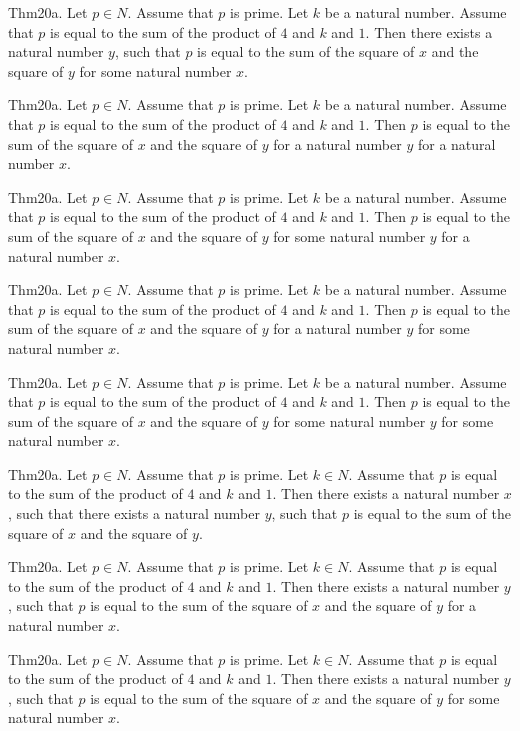 \documentclass{article}
\begin{document}
Thm20a. Let $p \in N$. Assume that $p$ is prime. Let $k$ be a natural number. Assume that $p$ is equal to the sum of the product of $4$ and $k$ and $1$. Then there exists a natural number $y$, such that $p$ is equal to the sum of the square of $x$ and the square of $y$ for some natural number $x$.

Thm20a. Let $p \in N$. Assume that $p$ is prime. Let $k$ be a natural number. Assume that $p$ is equal to the sum of the product of $4$ and $k$ and $1$. Then $p$ is equal to the sum of the square of $x$ and the square of $y$ for a natural number $y$ for a natural number $x$.

Thm20a. Let $p \in N$. Assume that $p$ is prime. Let $k$ be a natural number. Assume that $p$ is equal to the sum of the product of $4$ and $k$ and $1$. Then $p$ is equal to the sum of the square of $x$ and the square of $y$ for some natural number $y$ for a natural number $x$.

Thm20a. Let $p \in N$. Assume that $p$ is prime. Let $k$ be a natural number. Assume that $p$ is equal to the sum of the product of $4$ and $k$ and $1$. Then $p$ is equal to the sum of the square of $x$ and the square of $y$ for a natural number $y$ for some natural number $x$.

Thm20a. Let $p \in N$. Assume that $p$ is prime. Let $k$ be a natural number. Assume that $p$ is equal to the sum of the product of $4$ and $k$ and $1$. Then $p$ is equal to the sum of the square of $x$ and the square of $y$ for some natural number $y$ for some natural number $x$.

Thm20a. Let $p \in N$. Assume that $p$ is prime. Let $k \in N$. Assume that $p$ is equal to the sum of the product of $4$ and $k$ and $1$. Then there exists a natural number $x$, such that there exists a natural number $y$, such that $p$ is equal to the sum of the square of $x$ and the square of $y$.

Thm20a. Let $p \in N$. Assume that $p$ is prime. Let $k \in N$. Assume that $p$ is equal to the sum of the product of $4$ and $k$ and $1$. Then there exists a natural number $y$, such that $p$ is equal to the sum of the square of $x$ and the square of $y$ for a natural number $x$.

Thm20a. Let $p \in N$. Assume that $p$ is prime. Let $k \in N$. Assume that $p$ is equal to the sum of the product of $4$ and $k$ and $1$. Then there exists a natural number $y$, such that $p$ is equal to the sum of the square of $x$ and the square of $y$ for some natural number $x$.
\end{document}
